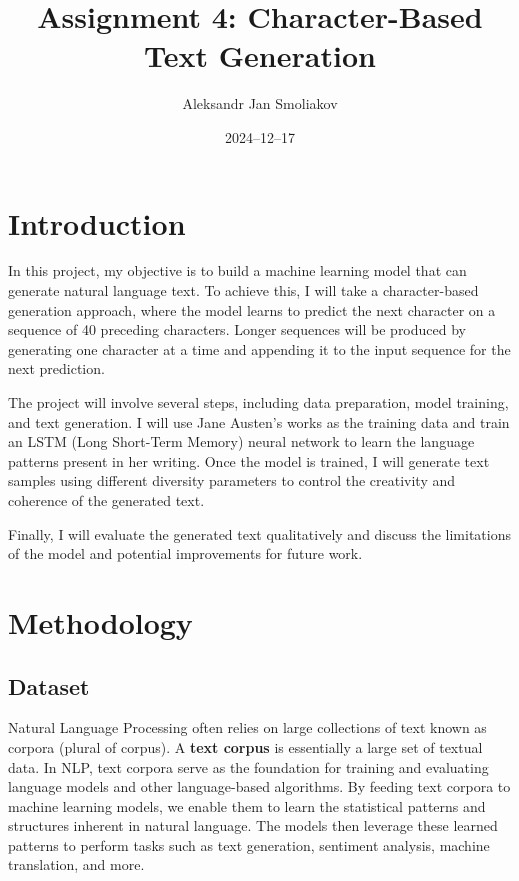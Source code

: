 \documentclass{article}
\title{Assignment 4: Character-Based Text Generation}
\author{Aleksandr Jan Smoliakov}
\date{2024--12--17}
\begin{document}
\maketitle

\section{Introduction}

In this project, my objective is to build a machine learning model that can generate natural language text. To achieve this, I will take a character-based generation approach, where the model learns to predict the next character on a sequence of 40 preceding characters. Longer sequences will be produced by generating one character at a time and appending it to the input sequence for the next prediction.

The project will involve several steps, including data preparation, model training, and text generation. I will use Jane Austen's works as the training data and train an LSTM (Long Short-Term Memory) neural network to learn the language patterns present in her writing. Once the model is trained, I will generate text samples using different diversity parameters to control the creativity and coherence of the generated text.

Finally, I will evaluate the generated text qualitatively and discuss the limitations of the model and potential improvements for future work.

\section{Methodology}

\subsection{Dataset}

Natural Language Processing often relies on large collections of text known as corpora (plural of corpus). A \textbf{text corpus} is essentially a large set of textual data. In NLP, text corpora serve as the foundation for training and evaluating language models and other language-based algorithms. By feeding text corpora to machine learning models, we enable them to learn the statistical patterns and structures inherent in natural language. The models then leverage these learned patterns to perform tasks such as text generation, sentiment analysis, machine translation, and more.
\end{document}
